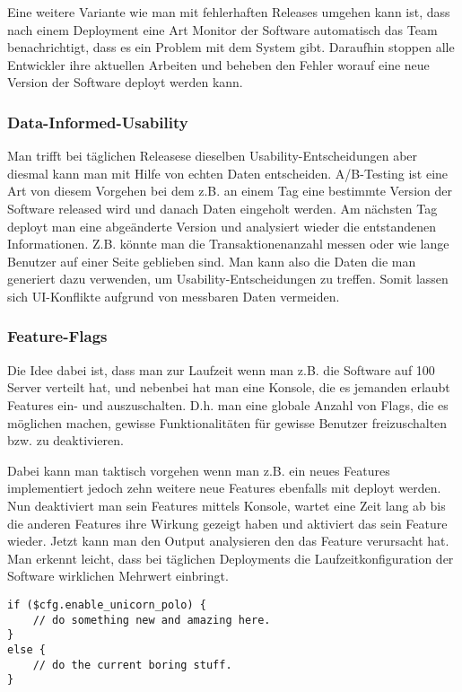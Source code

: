 Eine weitere Variante wie man mit fehlerhaften Releases umgehen kann ist, dass
nach einem Deployment eine Art Monitor der Software automatisch das Team
benachrichtigt, dass es ein Problem mit dem System gibt. Daraufhin stoppen
alle Entwickler ihre aktuellen Arbeiten und beheben den Fehler worauf eine
neue Version der Software deployt werden kann.

\subsubsection{Data-Informed-Usability}
Man trifft bei täglichen Releasese dieselben Usability-Entscheidungen aber
diesmal kann man mit Hilfe von echten Daten entscheiden. A/B-Testing ist eine
Art von diesem Vorgehen bei dem z.B. an einem Tag eine bestimmte Version der
Software released wird und danach Daten eingeholt werden. Am nächsten Tag
deployt man eine abgeänderte Version und analysiert wieder die entstandenen
Informationen. Z.B. könnte man die Transaktionenanzahl messen oder wie lange
Benutzer auf einer Seite geblieben sind. Man kann also die Daten die man
generiert dazu verwenden, um Usability-Entscheidungen zu treffen. Somit lassen
sich UI-Konflikte  aufgrund von messbaren Daten vermeiden.

\subsubsection{Feature-Flags}
\label{minisec:featureflags}
Die Idee dabei ist, dass man zur Laufzeit wenn man z.B. die Software auf 100
Server verteilt hat, und nebenbei hat man eine Konsole, die es jemanden
erlaubt Features ein- und auszuschalten. D.h. man eine globale Anzahl von
Flags, die es möglichen machen, gewisse Funktionalitäten für gewisse Benutzer
freizuschalten bzw. zu deaktivieren.

Dabei kann man taktisch vorgehen wenn man z.B. ein neues Features
implementiert jedoch zehn weitere neue Features ebenfalls mit deployt werden.
Nun deaktiviert man sein Features mittels Konsole, wartet eine Zeit lang ab
bis die anderen Features ihre Wirkung gezeigt haben und aktiviert das sein
Feature wieder. Jetzt kann man den Output analysieren den das Feature
verursacht hat. Man erkennt leicht, dass bei täglichen Deployments die
Laufzeitkonfiguration der Software wirklichen Mehrwert einbringt.

\begin{lstlisting}[float=h!tb,caption=Beispiel eines Feature Flags bei Flickr \cite{flickr09}, label=fflagcode]
if ($cfg.enable_unicorn_polo) {
    // do something new and amazing here.
}
else {
    // do the current boring stuff.
}
\end{lstlisting}

